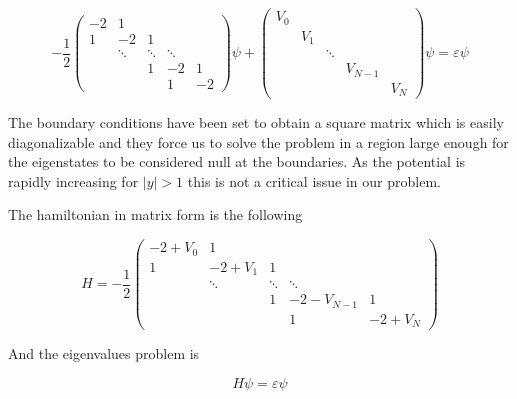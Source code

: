 \documentclass{article}
\begin{document}
\begin{equation}
-\frac{1}{2}
  \begin{pmatrix}
    -2 & 1 &&& \\
    1 & -2 & 1 && \\
    & \ddots & \ddots & \ddots & \\
    && 1 & -2 & 1 \\
    &&& 1 & -2
  \end{pmatrix}
\psi +
  \begin{pmatrix}
    V_0 \\
    & V_1 \\
    && \ddots \\
    &&& V_{N-1} \\
    &&&& V_N
  \end{pmatrix}
\psi = \varepsilon \psi
\end{equation}

The boundary conditions have been set to obtain a square matrix which is easily diagonalizable and they force us to solve the problem in a region large enough for the eigenstates to be considered null at the boundaries. As the potential is rapidly increasing for \( |y| > 1 \) this is not a critical issue in our problem.

The hamiltonian in matrix form is the following

\begin{equation}
H = -\frac{1}{2}
  \begin{pmatrix}
    -2+V_0 & 1 &&& \\
    1 & -2+V_1 & 1 && \\
    & \ddots & \ddots & \ddots & \\
    && 1 & -2-V_{N-1} & 1 \\
    &&& 1 & -2+V_N
  \end{pmatrix}
\end{equation}

And the eigenvalues problem is

\begin{equation}
H\psi = \varepsilon \psi
\end{equation}
\end{document}
